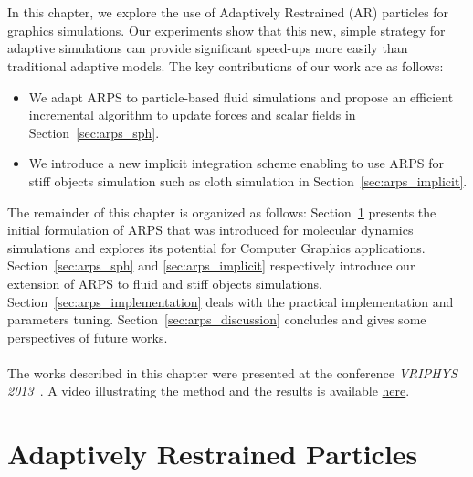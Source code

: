 \\ \\
In this chapter, we explore the use of Adaptively Restrained (AR) particles for graphics simulations. Our experiments show that this new, simple strategy for adaptive simulations can provide significant speed-ups more easily than traditional adaptive models. The key contributions of our work are as follows: 
\begin{itemize}
\item We adapt ARPS to particle-based fluid simulations and propose an efficient incremental algorithm to update forces and scalar fields in Section~\ref{sec:arps_sph}.
\item We introduce a new implicit integration scheme enabling to use ARPS for stiff objects simulation such as cloth simulation in Section~\ref{sec:arps_implicit}.
\end{itemize}

The remainder of this chapter is organized as follows: 
Section~\ref{sec:arps_basics} presents the initial formulation of ARPS that was introduced for molecular dynamics simulations and explores its potential for Computer Graphics applications. 
Section~\ref{sec:arps_sph} and \ref{sec:arps_implicit} respectively introduce our extension of ARPS to fluid and stiff objects simulations. 
Section~\ref{sec:arps_implementation} deals with the practical implementation and parameters tuning. 
Section~\ref{sec:arps_discussion} concludes and gives some perspectives of future works.
\\ \\
The works described in this chapter were presented at the conference \emph{VRIPHYS 2013}~\cite{Manteaux2013}. A video illustrating the method and the results is available \href{http://hal.inria.fr/docs/00/91/46/53/VIDEO/VideoPaper1004.flv}{here}.
\section{Adaptively Restrained Particles} 
\label{sec:arps_basics}
